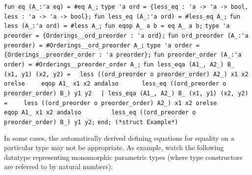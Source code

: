 \begin{isabellebody}
\begin{isamarkuptext}
\verb|fun eq (A_:'a eq) = #eq A_;|\newline%
\newline%
\verb|type 'a ord = {less_eq : 'a -> 'a -> bool, less : 'a -> 'a -> bool};|\newline%
\verb|fun less_eq (A_:'a ord) = #less_eq A_;|\newline%
\verb|fun less (A_:'a ord) = #less A_;|\newline%
\newline%
\verb|fun eqop A_ a b = eq A_ a b;|\newline%
\newline%
\verb|type 'a preorder = {Orderings__ord_preorder : 'a ord};|\newline%
\verb|fun ord_preorder (A_:'a preorder) = #Orderings__ord_preorder A_;|\newline%
\newline%
\verb|type 'a order = {Orderings__preorder_order : 'a preorder};|\newline%
\verb|fun preorder_order (A_:'a order) = #Orderings__preorder_order A_;|\newline%
\newline%
\verb|fun less_eqa (A1_, A2_) B_ (x1, y1) (x2, y2) =|\newline%
\verb|  less ((ord_preorder o preorder_order) A2_) x1 x2 orelse|\newline%
\verb|    eqop A1_ x1 x2 andalso|\newline%
\verb|      less_eq ((ord_preorder o preorder_order) B_) y1 y2|\newline%
\verb|  |\verb,|,\verb| less_eqa (A1_, A2_) B_ (x1, y1) (x2, y2) =|\newline%
\verb|    less ((ord_preorder o preorder_order) A2_) x1 x2 orelse|\newline%
\verb|      eqop A1_ x1 x2 andalso|\newline%
\verb|        less_eq ((ord_preorder o preorder_order) B_) y1 y2;|\newline%
\newline%
\verb|end; (*struct Example*)|%
\end{isamarkuptext}%
\isamarkuptrue%
%
\endisatagquoteme
{\isafoldquoteme}%
%
\isadelimquoteme
%
\endisadelimquoteme
%
\begin{isamarkuptext}%
In some cases, the automatically derived defining equations
  for equality on a particular type may not be appropriate.
  As example, watch the following datatype representing
  monomorphic parametric types (where type constructors
  are referred to by natural numbers):%

\end{isamarkuptext}
\end{isabellebody}
